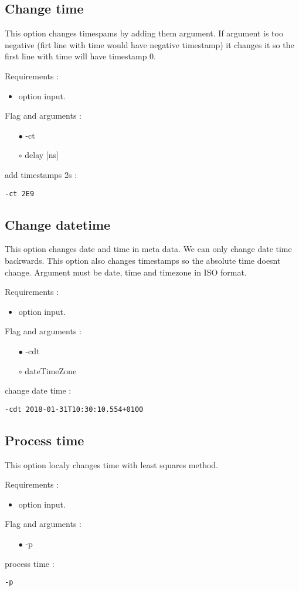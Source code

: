 \documentclass[english]{article}
\begin{document}
\subsection{Change time}
This option changes timespams by adding them argument. If argument is too negative (firt line with time would have negative timestamp) it changes it so the first line with time will have timestamp 0. 

\noindent Requirements : 
\begin{itemize}
\item option input. 
\end{itemize}
Flag and arguments :
\begin{itemize}
\item[$\bullet$] -ct
\item[$\circ$] delay [ns]
\end{itemize}
add timestamps 2s : 
\begin{lstlisting} 
-ct 2E9
\end{lstlisting}


\subsection{Change datetime}
This option changes date and time in meta data. We can only change date time backwards. This option also changes timestamps so the absolute time doesnt change. Argument must be date, time and timezone in ISO format. 

\noindent Requirements : 
\begin{itemize}
\item option input. 
\end{itemize}
Flag and arguments :
\begin{itemize}
\item[$\bullet$] -cdt
\item[$\circ$] dateTimeZone
\end{itemize}
change date time : 
\begin{lstlisting} 
-cdt 2018-01-31T10:30:10.554+0100
\end{lstlisting}


\subsection{Process time}
This option localy changes time with least squares method. 

\noindent Requirements : 
\begin{itemize}
\item option input. 
\end{itemize}
Flag and arguments :
\begin{itemize}
\item[$\bullet$] -p
\end{itemize}
process time : 
\begin{lstlisting} 
-p
\end{lstlisting}
\end{document}
